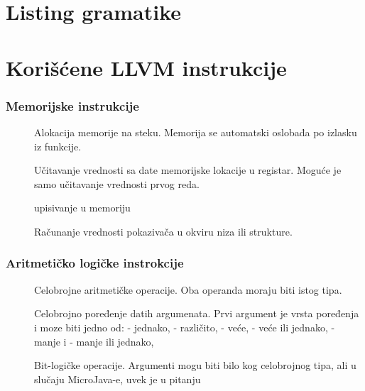 
\appendix

\chapter{Listing gramatike}
\lstset{
  basicstyle=\footnotesize
}



\chapter{Korišćene LLVM instrukcije}

\subsection*{Memorijske instrukcije}

\begin{description}
\item[] Alokacija memorije na steku. Memorija se automatski oslobađa po izlasku iz funkcije.
\item[] Učitavanje vrednosti sa date memorijske lokacije u registar. Moguće je samo učitavanje vrednosti prvog reda.
\item[] upisivanje u memoriju
\item[] Računanje vrednosti pokazivača u okviru niza ili strukture.
\end{description}

\subsection*{Aritmetičko logičke instrokcije}

\begin{description}
\item[] Celobrojne aritmetičke operacije. Oba operanda moraju biti istog tipa.
\item[] Celobrojno poređenje datih argumenata. Prvi argument je vrsta poređenja i moze biti
jedno od:  - jednako,   - različito,  - veće,  - veće ili jednako,   - manje i   - manje ili jednako, 
\item[] Bit-logičke operacije. Argumenti mogu biti bilo kog celobrojnog tipa, ali u slučaju MicroJava-e, uvek je u pitanju 
\end{description}

